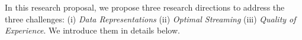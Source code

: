 In this research proposal, we propose three research directions to address the three challenges:
(i) {\em Data Representations} 
(ii) {\em Optimal Streaming} 
(iii) {\em Quality of Experience}. 
We introduce them in details below.

